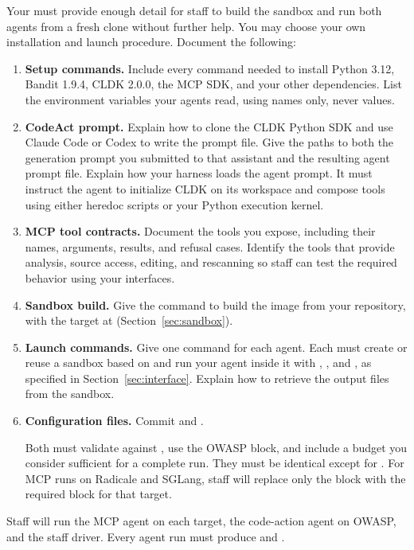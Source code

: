 \documentclass[9pt,letterpaper]{article}
\begin{document}
Your  must provide enough detail for staff to build the sandbox
and run both agents from a fresh clone without further help. You may choose your
own installation and launch procedure. Document the following:
\begin{enumerate}
\item \textbf{Setup commands.} Include every command needed to install Python
  3.12, Bandit 1.9.4, CLDK 2.0.0, the MCP SDK, and your other dependencies. List
  the environment variables your agents read, using names only, never values.
\item \textbf{CodeAct prompt.} Explain how to clone the CLDK Python SDK and use
  Claude Code or Codex to write the prompt file. Give the paths to both the
  generation prompt you submitted to that assistant and the resulting agent
  prompt file. Explain how your harness loads the agent prompt. It must instruct
  the agent to initialize CLDK on its workspace and compose tools using either
  heredoc scripts or your Python execution kernel.
\item \textbf{MCP tool contracts.} Document the tools you expose, including their
  names, arguments, results, and refusal cases. Identify the tools that provide
  analysis, source access, editing, and rescanning so staff can test the required
  behavior using your interfaces.
\item \textbf{Sandbox build.} Give the command to build the image from your
  repository, with the target at  (Section~\ref{sec:sandbox}).
\item \textbf{Launch commands.} Give one command for each agent. Each must create
  or reuse a sandbox based on  and run your agent inside it
  with , , and , as specified in
  Section~\ref{sec:interface}. Explain how to retrieve the output files from the
  sandbox.
\item \textbf{Configuration files.} Commit  and
  .

  Both must validate against
  , use the OWASP \code{[scan]} block, and include a
  budget you consider sufficient for a complete run. They must be identical
  except for . For MCP runs on Radicale and SGLang, staff will
  replace only the \code{[scan]} block with the required block for that target.
\end{enumerate}

Staff will run the MCP agent on each target, the code-action agent on OWASP, and
the staff driver. Every agent run must produce  and
.
\end{document}
